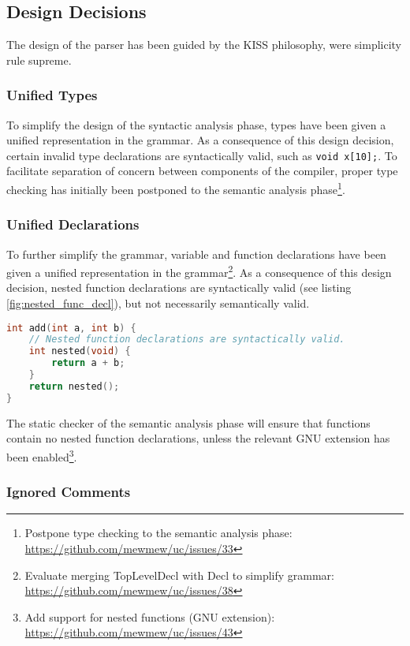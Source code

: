 \subsection{Design Decisions}

The design of the parser has been guided by the KISS philosophy, were simplicity rule supreme.

\subsubsection{Unified Types}

To simplify the design of the syntactic analysis phase, types have been given a unified representation in the grammar. As a consequence of this design decision, certain invalid type declarations are syntactically valid, such as \texttt{void x[10];}. To facilitate separation of concern between components of the compiler, proper type checking has initially been postponed to the semantic analysis phase\footnote{Postpone type checking to the semantic analysis phase: \url{https://github.com/mewmew/uc/issues/33}}.

\subsubsection{Unified Declarations}

To further simplify the grammar, variable and function declarations have been given a unified representation in the grammar\footnote{Evaluate merging TopLevelDecl with Decl to simplify grammar: \url{https://github.com/mewmew/uc/issues/38}}. As a consequence of this design decision, nested function declarations are syntactically valid (see listing \ref{fig:nested_func_decl}), but not necessarily semantically valid.

\begin{lstlisting}[language=C,style=c,caption={\label{fig:nested_func_decl}Nested function declarations.}]
int add(int a, int b) {
	// Nested function declarations are syntactically valid.
	int nested(void) {
		return a + b;
	}
	return nested();
}
\end{lstlisting}

The static checker of the semantic analysis phase will ensure that functions contain no nested function declarations, unless the relevant GNU extension has been enabled\footnote{Add support for nested functions (GNU extension): \url{https://github.com/mewmew/uc/issues/43}}.

\subsubsection{Ignored Comments}

